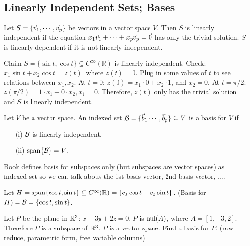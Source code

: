 \documentclass[10pt,a4paper]{article}
\begin{document}
\subsection{Linearly Independent Sets; Bases}
\begin{definition}
	Let $S = \{\vec{v}_1,\cdots,\vec{v}_p\}$ be vectors in a vector space $V$. Then $S$ is linearly independent if the equation $x_1\vec{v}_1 + \cdots + x_p \vec{v}_p = \vec{0}$ has only the trivial solution. $S$ is linearly dependent if it is not linearly independent.
\end{definition}

\begin{example}
	Claim $S=\{\sin{t},\cos{t} \} \subseteq C^\infty (\mathbb{R})$ is linearly independent.
	Check: $x_1 \sin{t} + x_2\cos{t} = z(t)$, where $z(t) = 0$. Plug in some values of $t$ to see relations between $x_1,x_2$. At $t=0$: $z(0) = x_1 \cdot 0 + x_2 \cdot 1$, and $ x_2 = 0$. At $t=\pi/2$: $z(\pi/2) = 1 \cdot x_1 + 0\cdot x_2,x_1 = 0$. Therefore, $z(t)$ only has the trivial solution and $S$ is linearly independent.
\end{example}

\begin{definition}
	Let $V$ be a vector space. An indexed set $\mathcal{B} = \{\vec{b}_1\cdots,\vec{b}_p\}\subseteq V$ is a \underline{basis} for $V$ if
	\begin{enumerate}
		\item[(i)] $\mathcal{B}$ is linearly independent.
		\item[(ii)] $\text{span}\{\mathcal{B}\} = V$.
	\end{enumerate}
\end{definition}
\begin{remark}
	Book defines basis for subspaces only (but subspaces are vector spaces) as indexed set so we can talk about the 1st basis vector, 2nd basis vector, $\dots$.
\end{remark}

\begin{example}
	Let $H = \text{span}\{\cos{t},\sin{t}\} \subseteq C^\infty (\mathbb{R}) = \{c_1 \cos{t}+c_2 \sin{t}\}$. (Basis for $H) = \mathcal{B} = \{\cos{t},\sin{t}\}$.
\end{example}
\begin{example}
	Let $P$ be the plane in $\mathbb{R}^3$: $x-3y+2z = 0$. $P$ is $\text{nul}(A)$, where $A = [1,-3,2]$. Therefore $P$ is a subspace of $\mathbb{R}^3$. $P$ is a vector space. Find a basis for $P$. (row reduce, parametric form, free variable columns)
\end{example}
\end{document}

